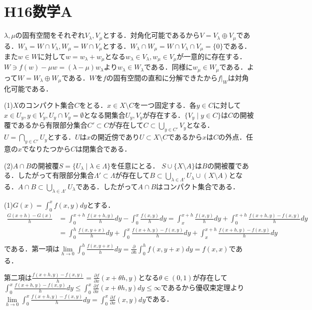 \documentclass[
		book,
		head_space=20mm,
		foot_space=20mm,
		gutter=10mm,
		line_length=190mm
]{jlreq}
\begin{document}
\section{H16数学A}
$\lambda,\mu$の固有空間をそれぞれ$V_\lambda,V_\mu$とする．対角化可能であるから$V=V_\lambda \oplus V_\mu$である．$W_\lambda=W \cap V_\lambda,W_\mu=W \cap V_\mu$とする．$W_\lambda\cap W_\mu=W\cap V_\lambda \cap V_\mu=\{0\}$である．また$w\in W$に対して$w=w_\lambda+w_\mu$となる$w_\lambda\in V_\lambda, w_\mu \in V_\mu$が一意的に存在する．$W\ni f(w) -\mu w=(\lambda-\mu)w_\lambda $より$w_\lambda\in W_\lambda$である．同様に$w_\mu\in W_\mu$である．よって$W=W_\lambda \oplus W_\mu$である．$W$を$f$の固有空間の直和に分解できたから$f|_W$は対角化可能である．

(1)$X$のコンパクト集合$C$をとる．$x \in X\setminus C$を一つ固定する．各$y \in C$に対して$x \in U_y,y\in V_y,U_y \cap V_y=\emptyset$となる開集合$U_y,V_y$が存在する．$\{ V_y \mid y \in C\}$は$C$の開被覆であるから有限部分集合$C'\subset C$が存在して$C\subset \bigcup_{y\in C'}V_y$となる．$U=\bigcap_{y\in C'}U_y$とする．$U$は$x$の開近傍であり$U \subset X \setminus C$であるから$x$は$C$の外点．任意の$x$でなりたつから$C$は閉集合である．

(2)$A \cap B$の開被覆$S= \{ U_\lambda \mid \lambda \in \Lambda\}$を任意にとる．
$S \cup \{ X\setminus A\}$は$B$の開被覆である．したがって有限部分集合$\Lambda' \subset \Lambda$が存在して$B \subset \bigcup_{\lambda \in \Lambda'}U_\lambda \cup (X\setminus A)$となる．$A \cap B \subset \bigcup_{\lambda \in \Lambda'}U_\lambda$である．したがって$A \cap B$はコンパクト集合である．

(1)$G(x)=\int_0^xf(x,y)dy$とする．
\begin{align}
 \frac{G(x+h)-G(x)}{h} &=  \int_0^{x+h} \frac{f(x+h,y)}{h}dy - \int_0^x \frac{f(x,y)}{h}dy =  \int_x^{x+h} \frac{f(x,y)}{h}dy + \int_0^{x+h} \frac{f(x+h,y)-f(x,y)}{h}dy \\
&= \int_0^h  \frac{f(x,y+x)}{h} dy  +  \int_0^x \frac{f(x+h,y)-f(x,y)}{h}dy+ \int_x^{x+h} \frac{f(x+h,y)-f(x,y)}{h}dy \\
\end{align}
である．第一項は$\lim\limits_{h\to 0}\int_0^h  \frac{f(x,y+x)}{h} dy =\frac{\partial }{\partial h}\int_0^h  f(x,y+x)dy =f(x,x)$である．

第二項は$\frac{f(x+h,y)-f(x,y)}{h}=\frac{\partial f}{\partial x}(x+\theta h,y)$となる$\theta \in (0,1)$が存在して$ \int_0^x \frac{f(x+h,y)-f(x,y)}{h}dy\le  \int_0^x \frac{\partial f}{\partial x}(x+\theta h,y)dy\le \infty$であるから優収束定理より$\lim\limits_{h\to 0} \int_0^x \frac{f(x+h,y)-f(x,y)}{h}dy=\int_0^x \frac{\partial f}{\partial x}(x,y)dy$である．
\end{document}

